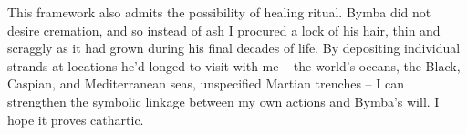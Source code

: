 \documentclass[twoside,10pt]{article}
\begin{document}
\begin{article*}
This framework also admits the possibility of healing ritual. Bymba did not desire cremation, and so instead of ash I procured a lock of his hair, thin and scraggly as it had grown during his final decades of life. By depositing individual strands at locations he’d longed to visit with me – the world’s oceans, the Black, Caspian, and Mediterranean seas, unspecified Martian trenches – I can strengthen the symbolic linkage between my own actions and Bymba’s will. I hope it proves cathartic.
\\\\

\end{article*}
\end{document}
